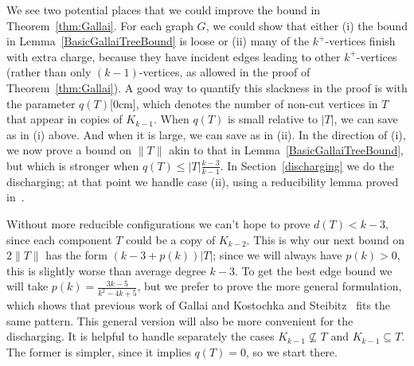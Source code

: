 \documentclass[12pt]{article}
\theoremstyle{plain}
\theoremstyle{definition}
\theoremstyle{remark}
\newcommand{\aside}[1]{\marginnote{\scriptsize{#1}}[0cm]}
\begin{document}
We see two potential places that we could improve the bound in
Theorem~\ref{thm:Gallai}. For each graph $G$, we could show that either (i) the
bound in Lemma~\ref{BasicGallaiTreeBound} is loose or (ii) many of the
$k^+$-vertices finish with extra charge, because they have incident edges
leading to other $k^+$-vertices (rather than only $(k-1)$-vertices, as allowed
in the proof of Theorem~\ref{thm:Gallai}).  A good way to quantify this
slackness in the proof is with the parameter $q(T)$\aside{$q(T)$}, which
denotes the number of non-cut vertices in $T$ that appear in copies of
$K_{k-1}$.  When $q(T)$ is small relative to $|T|$, we can save as in (i)
above.  And when it is large, we can save as in (ii).  In the direction of (i),
we now prove a bound on $\|T\|$ akin to that in
Lemma~\ref{BasicGallaiTreeBound}, but which is stronger when
$q(T)\le|T|\frac{k-3}{k-1}$.  In Section~\ref{discharging} 
we do the discharging; at that point we handle case (ii),
using a reducibility lemma proved in~\cite{OreVizing}. 

Without more reducible configurations we can't hope to prove $d(T) < k-3$, since
each component $T$ could be a copy of $K_{k-2}$.  This is why our next bound on
$2\|T\|$ has the form $(k-3 + p(k))|T|$; since we will always have $p(k)>0$,
this is slightly worse than average degree $k-3$.  To get the best edge bound
we will take $p(k)=\frac{3k-5}{k^2 - 4k + 5}$, but we prefer to prove the more general
formulation, which shows that previous work of Gallai \cite{gallai1963kritische}
and Kostochka and Steibitz~\cite{kostochkastiebitzedgesincriticalgraph} fits
the same pattern.  This general version will also be more
convenient for the discharging.  %
It is helpful to handle separately the cases $K_{k-1}\not\subseteq T$ and
$K_{k-1}\subseteq T$.  The former is simpler, since it implies $q(T)=0$, so we
start there.
\end{document}
